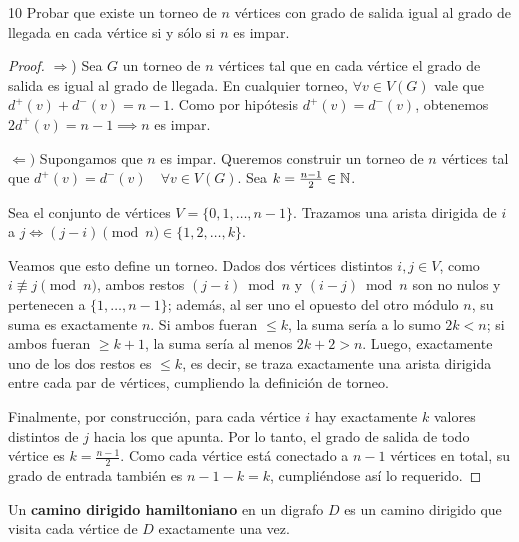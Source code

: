 \begin{ejercicio}{10}
	Probar que existe un torneo de \( n \) vértices con grado de salida igual al grado de llegada en cada vértice si y sólo si \( n \) es impar.
\end{ejercicio}
\begin{proof}
	\(\Longrightarrow\)) Sea \( G \) un torneo de \( n \) vértices tal que en cada vértice el grado de salida es igual al grado de llegada. En cualquier torneo, \(\forall v \in V(G) \) vale que \( d^+(v) + d^-(v) = n-1 \). Como por hipótesis \( d^+(v) = d^-(v) \), obtenemos \( 2d^+(v) = n-1 \implies n \) es impar.

	\(\Longleftarrow)\) Supongamos que \( n \) es impar. Queremos construir un torneo de \( n \) vértices tal que \( d^+(v) = d^-(v) \quad \forall v \in V(G) \). Sea \( k = \frac{n-1}{2} \in \mathbb{N} \).

	Sea el conjunto de vértices \( V = \{0, 1, \ldots, n-1\} \). Trazamos una arista dirigida de \( i \) a \( j \iff (j - i) \pmod n \in \{1, 2, \ldots, k\} \).

	Veamos que esto define un torneo. Dados dos vértices distintos \( i, j \in V \), como \( i \not\equiv j \pmod n \), ambos restos \( (j-i) \bmod n \) y \( (i-j) \bmod n \) son no nulos y pertenecen a \( \{1, \ldots, n-1\} \); además, al ser uno el opuesto del otro módulo \( n \), su suma es exactamente \( n \). Si ambos fueran \( \le k \), la suma sería a lo sumo \( 2k < n \); si ambos fueran \( \ge k+1 \), la suma sería al menos \( 2k+2 > n \). Luego, exactamente uno de los dos restos es \( \le k \), es decir, se traza exactamente una arista dirigida entre cada par de vértices, cumpliendo la definición de torneo.

	Finalmente, por construcción, para cada vértice \( i \) hay exactamente \( k \) valores distintos de \( j \) hacia los que apunta. Por lo tanto, el grado de salida de todo vértice es \( k = \frac{n-1}{2} \). Como cada vértice está conectado a \( n-1 \) vértices en total, su grado de entrada también es \( n - 1 - k = k \), cumpliéndose así lo requerido.
\end{proof}

\vspace{0.5cm}

\begin{definition}
	Un \textbf{camino dirigido hamiltoniano} en un digrafo \( D \) es un camino dirigido que visita cada vértice de \( D \) exactamente una vez.
\end{definition}

